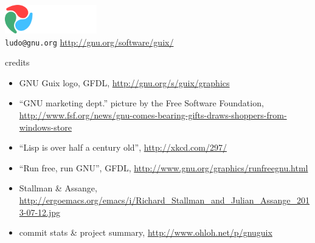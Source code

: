 \documentclass{beamer}
\begin{document}
\begin{frame}{}

\vfill{
  \vspace{6.5cm}
  \hfill{\includegraphics[width=0.3\textwidth]{images/guix-logo-white}}\\[0.2cm]
  \texttt{ludo@gnu.org} \hfill{\alert{\url{http://gnu.org/software/guix/}}}
}

\end{frame}

\begin{frame}{credits}
  \small{
  \begin{itemize}
  \item GNU Guix logo, GFDL, \url{http://gnu.org/s/guix/graphics}
  \item ``GNU marketing dept.'' picture by the Free Software Foundation,
    \url{http://www.fsf.org/news/gnu-comes-bearing-gifts-draws-shoppers-from-windows-store}
  \item ``Lisp is over half a century old'', \url{http://xkcd.com/297/}
  \item ``Run free, run GNU'', GFDL,
    \url{http://www.gnu.org/graphics/runfreegnu.html}
  \item Stallman \& Assange,
    \url{http://ergoemacs.org/emacs/i/Richard_Stallman_and_Julian_Assange_2013-07-12.jpg}
  \item commit stats \& project summary,
    \url{http://www.ohloh.net/p/gnuguix}
  \end{itemize}
  }
\end{frame}
\end{document}
